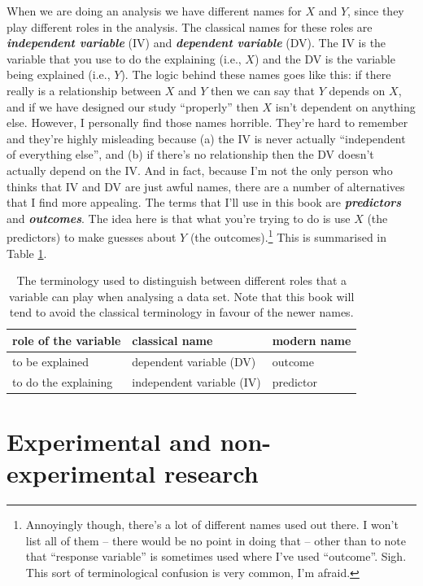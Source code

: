 \documentclass[
]{book}
\begin{document}
When we are doing an analysis we have different names for \(X\) and \(Y\), since they play different roles in the analysis. The classical names for these roles are \textbf{\emph{independent variable}} (IV) and \textbf{\emph{dependent variable}} (DV). The IV is the variable that you use to do the explaining (i.e., \(X\)) and the DV is the variable being explained (i.e., \(Y\)). The logic behind these names goes like this: if there really is a relationship between \(X\) and \(Y\) then we can say that \(Y\) depends on \(X\), and if we have designed our study ``properly'' then \(X\) isn't dependent on anything else. However, I personally find those names horrible. They're hard to remember and they're highly misleading because (a) the IV is never actually ``independent of everything else'', and (b) if there's no relationship then the DV doesn't actually depend on the IV. And in fact, because I'm not the only person who thinks that IV and DV are just awful names, there are a number of alternatives that I find more appealing. The terms that I'll use in this book are \textbf{\emph{predictors}} and \textbf{\emph{outcomes}}. The idea here is that what you're trying to do is use \(X\) (the predictors) to make guesses about \(Y\) (the outcomes).\footnote{Annoyingly though, there's a lot of different names used out there. I won't list all of them -- there would be no point in doing that -- other than to note that ``response variable'' is sometimes used where I've used ``outcome''. Sigh. This sort of terminological confusion is very common, I'm afraid.} This is summarised in Table \ref{tab:ivdv}.

\begin{table}

\caption{\label{tab:ivdv}The terminology used to distinguish between different roles that a variable can play when analysing a data set. Note that this book will tend to avoid the classical terminology in favour of the newer names.}
\centering
\begin{tabular}[t]{lll}
\toprule
role of the variable & classical name & modern name\\
\midrule
to be explained & dependent variable (DV) & outcome\\
to do the explaining & independent variable (IV) & predictor\\
\bottomrule
\end{tabular}
\end{table}

\hypertarget{researchdesigns}{%
\section{Experimental and non-experimental research}\label{researchdesigns}}
\end{document}
